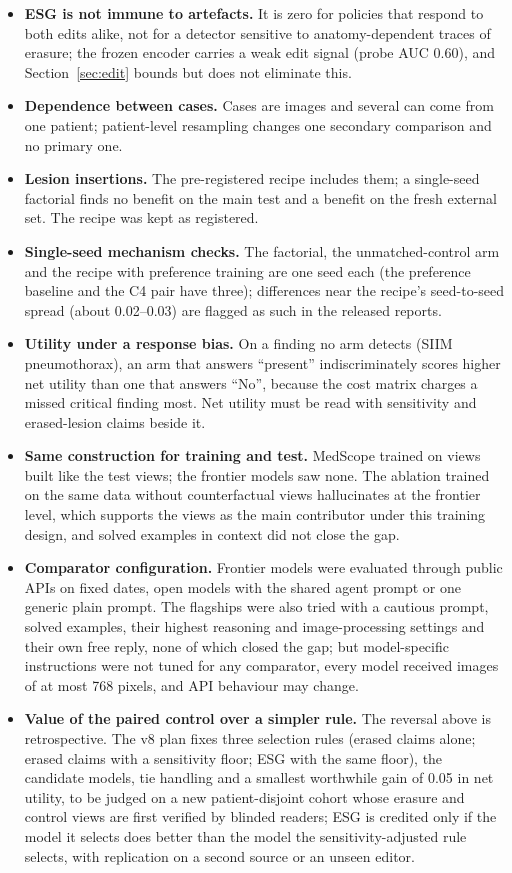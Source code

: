 \documentclass[11pt]{article}
\begin{document}
\begin{itemize}[leftmargin=*,nosep]
\item \textbf{ESG is not immune to artefacts.} It is zero for policies that respond to both edits alike, not for a detector sensitive to anatomy-dependent traces of erasure; the frozen encoder carries a weak edit signal (probe AUC 0.60), and Section~\ref{sec:edit} bounds but does not eliminate this.
\item \textbf{Dependence between cases.} Cases are images and several can come from one patient; patient-level resampling changes one secondary comparison and no primary one.
\item \textbf{Lesion insertions.} The pre-registered recipe includes them; a single-seed factorial finds no benefit on the main test and a benefit on the fresh external set. The recipe was kept as registered.
\item \textbf{Single-seed mechanism checks.} The factorial, the unmatched-control arm and the recipe with preference training are one seed each (the preference baseline and the C4 pair have three); differences near the recipe's seed-to-seed spread (about 0.02--0.03) are flagged as such in the released reports.
\item \textbf{Utility under a response bias.} On a finding no arm detects (SIIM pneumothorax), an arm that answers ``present'' indiscriminately scores higher net utility than one that answers ``No'', because the cost matrix charges a missed critical finding most. Net utility must be read with sensitivity and erased-lesion claims beside it.
\item \textbf{Same construction for training and test.} MedScope trained on views built like the test views; the frontier models saw none. The ablation trained on the same data without counterfactual views hallucinates at the frontier level, which supports the views as the main contributor under this training design, and solved examples in context did not close the gap.
\item \textbf{Comparator configuration.} Frontier models were evaluated through public APIs on fixed dates, open models with the shared agent prompt or one generic plain prompt. The flagships were also tried with a cautious prompt, solved examples, their highest reasoning and image-processing settings and their own free reply, none of which closed the gap; but model-specific instructions were not tuned for any comparator, every model received images of at most 768 pixels, and API behaviour may change.
\item \textbf{Value of the paired control over a simpler rule.} The reversal above is retrospective. The v8 plan fixes three selection rules (erased claims alone; erased claims with a sensitivity floor; ESG with the same floor), the candidate models, tie handling and a smallest worthwhile gain of 0.05 in net utility, to be judged on a new patient-disjoint cohort whose erasure and control views are first verified by blinded readers; ESG is credited only if the model it selects does better than the model the sensitivity-adjusted rule selects, with replication on a second source or an unseen editor.

\end{itemize}
\end{document}
